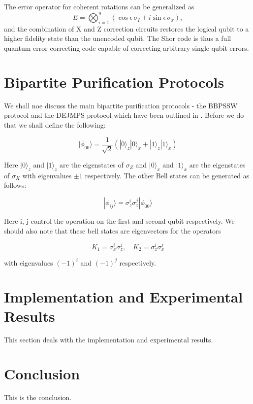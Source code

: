 \documentclass[conference]{IEEEtran}
\begin{document}
The error operator for coherent rotations can be generalized as
\begin{equation}
E = \bigotimes_{i=1}^{9} (\cos \epsilon\, \sigma_I + i \sin \epsilon\, \sigma_x),
\end{equation}
and the combination of X and Z correction circuits restores the logical qubit to a higher fidelity state than the unencoded qubit. The Shor code is thus a full quantum error correcting code capable of correcting arbitrary single-qubit errors.



\section{Bipartite Purification Protocols}
We shall noe discuss the main bipartite purification protocols - the BBPSSW protocol and the DEJMPS protocol which have been outlined in \cite{paper2}. Before we do that we shall define the following:

\begin{equation}
    | \phi_{00} \rangle = \frac{1}{\sqrt{2}} (|0\rangle_z |0\rangle_x + |1\rangle_z |1\rangle_x)
\end{equation}

Here $|0\rangle_z$ and $|1\rangle_z$ are the eigenstates of $\sigma_Z$ and $|0\rangle_x$ and $|1\rangle_x$ are the eigenstates of $\sigma_X$ with eigenvalues $\pm 1$ respectively. The other Bell states can be generated as follows:

\begin{equation}
    | \phi_{ij} \rangle = \sigma_z^i \sigma_z^j | \phi_{00} \rangle
\end{equation}

Here i, j control the operation on the first and second qubit respectively. We should also note that these bell states are eigenvectors for the operators

\begin{equation}
    K_1 = \sigma_x^i \sigma_z^j, \quad K_2 = \sigma_z^i \sigma_x^j
\end{equation}

with eigenvalues $(-1)^i$ and $(-1)^j$ respectively.

\section{Implementation and Experimental Results}
This section deals with the implementation and experimental results.

\section{Conclusion}
This is the conclusion.



\end{document}
